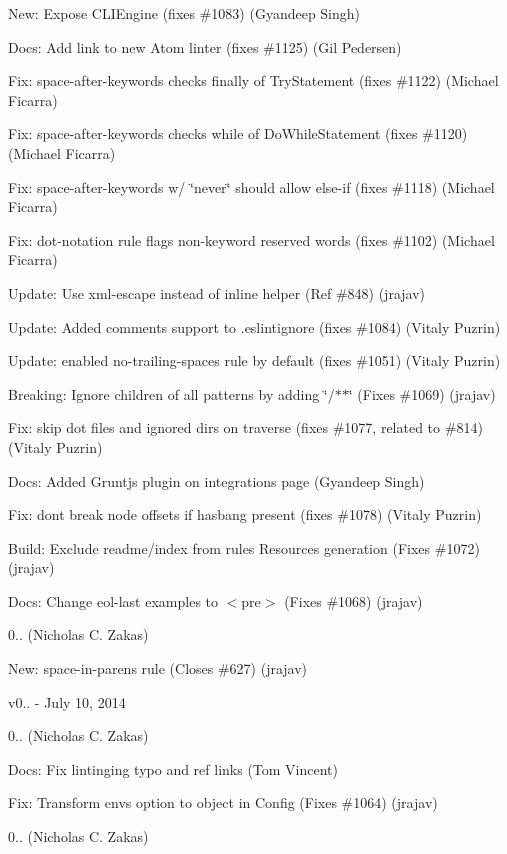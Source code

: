 \begin{DoxyItemize}
\item New\+: Expose C\+L\+I\+Engine (fixes \#1083) (Gyandeep Singh)
\item Docs\+: Add link to new Atom linter (fixes \#1125) (Gil Pedersen)
\item Fix\+: space-\/after-\/keywords checks finally of Try\+Statement (fixes \#1122) (Michael Ficarra)
\item Fix\+: space-\/after-\/keywords checks while of Do\+While\+Statement (fixes \#1120) (Michael Ficarra)
\item Fix\+: space-\/after-\/keywords w/ \char`\"{}never\char`\"{} should allow else-\/if (fixes \#1118) (Michael Ficarra)
\item Fix\+: dot-\/notation rule flags non-\/keyword reserved words (fixes \#1102) (Michael Ficarra)
\item Update\+: Use xml-\/escape instead of inline helper (Ref \#848) (jrajav)
\item Update\+: Added comments support to .eslintignore (fixes \#1084) (Vitaly Puzrin)
\item Update\+: enabled \textquotesingle{}no-\/trailing-\/spaces\textquotesingle{} rule by default (fixes \#1051) (Vitaly Puzrin)
\item Breaking\+: Ignore children of all patterns by adding \char`\"{}/$\ast$$\ast$\char`\"{} (Fixes \#1069) (jrajav)
\item Fix\+: skip dot files and ignored dirs on traverse (fixes \#1077, related to \#814) (Vitaly Puzrin)
\item Docs\+: Added Gruntjs plugin on integrations page (Gyandeep Singh)
\item Fix\+: don\textquotesingle{}t break node offsets if hasbang present (fixes \#1078) (Vitaly Puzrin)
\item Build\+: Exclude readme/index from rules Resources generation (Fixes \#1072) (jrajav)
\item Docs\+: Change eol-\/last examples to {\ttfamily $<$pre$>$} (Fixes \#1068) (jrajav)
\item 0.. (Nicholas C. Zakas)
\item New\+: space-\/in-\/parens rule (Closes \#627) (jrajav)
\end{DoxyItemize}

v0.. -\/ July 10, 2014


\begin{DoxyItemize}
\item 0.. (Nicholas C. Zakas)
\item Docs\+: Fix \textquotesingle{}lintinging\textquotesingle{} typo and ref links (Tom Vincent)
\item Fix\+: Transform envs option to object in Config (Fixes \#1064) (jrajav)
\item 0.. (Nicholas C. Zakas)
\end{DoxyItemize}

